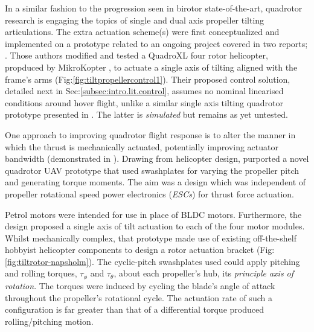 \par
In a similar fashion to the progression seen in birotor state-of-the-art, quadrotor research is engaging the topics of single and dual axis propeller tilting articulations. The extra actuation scheme(s) were first conceptualized and implemented on a prototype related to an ongoing project covered in two reports; \cite{tiltpropellercontrol,tiltpropellerflight}. Those authors modified and tested a QuadroXL four rotor helicopter, propduced by MikroKopter \cite{mikrokopter}, to actuate a single axis of tilting aligned with the frame's arms (Fig:\ref{fig:tiltpropellercontrol1}). Their proposed control solution, detailed next in Sec:\ref{subsec:intro.lit.control}, assumes no nominal linearised conditions around hover flight, unlike a similar single axis tilting quadrotor prototype presented in \cite{singleaxistilting}. The latter is \emph{simulated} but remains as yet untested.
\par
One approach to improving quadrotor flight response is to alter the manner in which the thrust is mechanically actuated, potentially improving actuator bandwidth (demonstrated in \cite{tiltgasco,tiltrihani}). Drawing from helicopter design, \cite{napsholm} purported a novel quadrotor UAV prototype that used swashplates for varying the propeller pitch and generating torque moments. The aim was a design which was independent of propeller rotational speed power electronics (\emph{ESCs}) for thrust force actuation.
\par
Petrol motors were intended for use in place of BLDC motors. Furthermore, the design proposed a single axis of tilt actuation to each of the four motor modules. Whilst mechanically complex, that prototype made use of existing off-the-shelf hobbyist helicopter components to design a rotor actuation bracket (Fig:\ref{fig:tiltrotor-napsholm}). The cyclic-pitch swashplates \cite{autonomousrobotspitch} used could apply pitching and rolling torques, $\tau_{\phi}$ and $\tau_{\theta}$, about each propeller's hub, its \emph{principle axis of rotation}. The torques were induced by cycling the blade's angle of attack throughout the propeller's rotational cycle. The actuation rate of such a configuration is far greater than that of a differential torque produced rolling/pitching motion.
